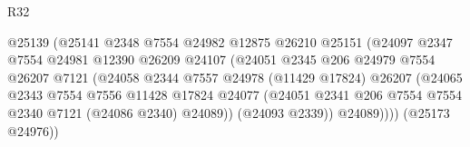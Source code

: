\begin{lexlean}{R32}
\begin{coremodule}
                                          @25139
                                          (@25141
                                            @2348
                                            @7554
                                            @24982
                                            @12875
                                            @26210
                                            @25151
                                            (@24097
                                              @2347
                                              @7554
                                              @24981
                                              @12390
                                              @26209
                                              @24107
                                              (@24051
                                                @2345
                                                @206
                                                @24979
                                                @7554
                                                @26207
                                                @7121
                                                (@24058
                                                  @2344
                                                  @7557
                                                  @24978
                                                  (@11429 @17824)
                                                  @26207
                                                  (@24065
                                                    @2343
                                                    @7554
                                                    @7556
                                                    @11428
                                                    @17824
                                                    @24077
                                                    (@24051
                                                      @2341
                                                      @206
                                                      @7554
                                                      @7554
                                                      @2340
                                                      @7121
                                                      (@24086 @2340)
                                                      @24089))
                                                  (@24093 @2339))
                                                @24089))))
                                        (@25173 @24976))

\end{coremodule}
\end{lexlean}
